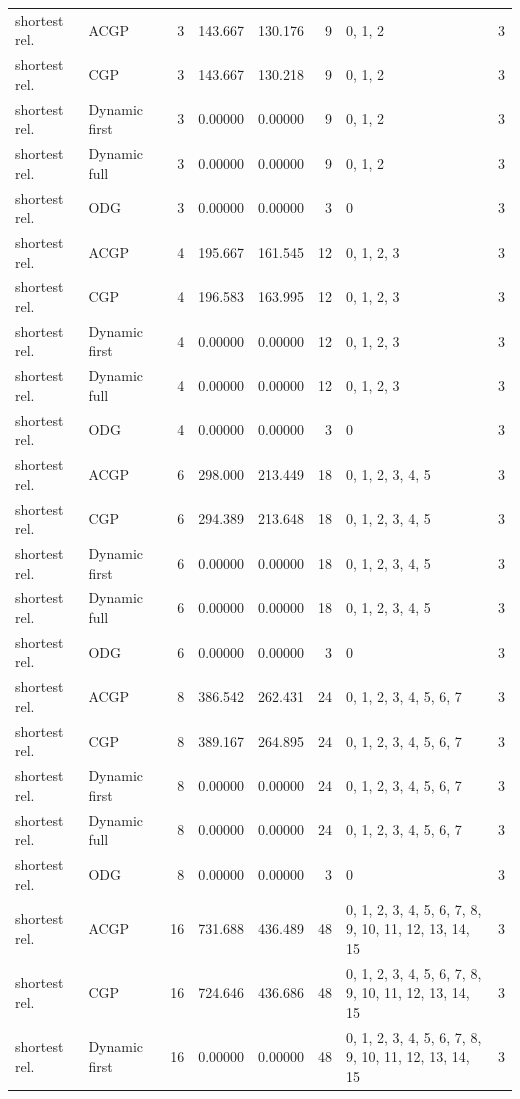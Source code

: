 \documentclass[10pt,a4paper]{article}
\begin{document}
\begin{longtable}{@{}p{23mm}p{29mm}rrrrp{36mm}r@{}}
shortest rel. & ACGP & 3 & 143.667 & 130.176 & 9 & 0, 1, 2 & 3 \\
shortest rel. & CGP & 3 & 143.667 & 130.218 & 9 & 0, 1, 2 & 3 \\
shortest rel. & Dynamic first & 3 & 0.00000 & 0.00000 & 9 & 0, 1, 2 & 3 \\
shortest rel. & Dynamic full & 3 & 0.00000 & 0.00000 & 9 & 0, 1, 2 & 3 \\
shortest rel. & ODG & 3 & 0.00000 & 0.00000 & 3 & 0 & 3 \\
shortest rel. & ACGP & 4 & 195.667 & 161.545 & 12 & 0, 1, 2, 3 & 3 \\
shortest rel. & CGP & 4 & 196.583 & 163.995 & 12 & 0, 1, 2, 3 & 3 \\
shortest rel. & Dynamic first & 4 & 0.00000 & 0.00000 & 12 & 0, 1, 2, 3 & 3 \\
shortest rel. & Dynamic full & 4 & 0.00000 & 0.00000 & 12 & 0, 1, 2, 3 & 3 \\
shortest rel. & ODG & 4 & 0.00000 & 0.00000 & 3 & 0 & 3 \\
shortest rel. & ACGP & 6 & 298.000 & 213.449 & 18 & 0, 1, 2, 3, 4, 5 & 3 \\
shortest rel. & CGP & 6 & 294.389 & 213.648 & 18 & 0, 1, 2, 3, 4, 5 & 3 \\
shortest rel. & Dynamic first & 6 & 0.00000 & 0.00000 & 18 & 0, 1, 2, 3, 4, 5 & 3 \\
shortest rel. & Dynamic full & 6 & 0.00000 & 0.00000 & 18 & 0, 1, 2, 3, 4, 5 & 3 \\
shortest rel. & ODG & 6 & 0.00000 & 0.00000 & 3 & 0 & 3 \\
shortest rel. & ACGP & 8 & 386.542 & 262.431 & 24 & 0, 1, 2, 3, 4, 5, 6, 7 & 3 \\
shortest rel. & CGP & 8 & 389.167 & 264.895 & 24 & 0, 1, 2, 3, 4, 5, 6, 7 & 3 \\
shortest rel. & Dynamic first & 8 & 0.00000 & 0.00000 & 24 & 0, 1, 2, 3, 4, 5, 6, 7 & 3 \\
shortest rel. & Dynamic full & 8 & 0.00000 & 0.00000 & 24 & 0, 1, 2, 3, 4, 5, 6, 7 & 3 \\
shortest rel. & ODG & 8 & 0.00000 & 0.00000 & 3 & 0 & 3 \\
shortest rel. & ACGP & 16 & 731.688 & 436.489 & 48 & 0, 1, 2, 3, 4, 5, 6, 7, 8, 9, 10, 11, 12, 13, 14, 15 & 3 \\
shortest rel. & CGP & 16 & 724.646 & 436.686 & 48 & 0, 1, 2, 3, 4, 5, 6, 7, 8, 9, 10, 11, 12, 13, 14, 15 & 3 \\
shortest rel. & Dynamic first & 16 & 0.00000 & 0.00000 & 48 & 0, 1, 2, 3, 4, 5, 6, 7, 8, 9, 10, 11, 12, 13, 14, 15 & 3 \\

\end{longtable}
\end{document}
